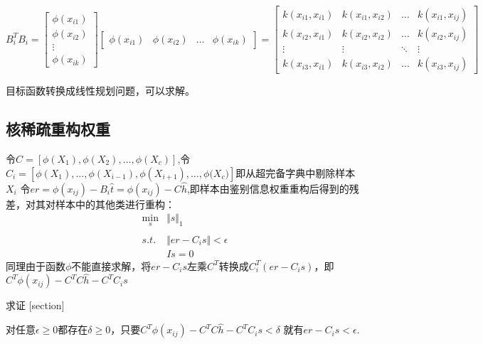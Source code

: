 \documentclass[bachelor,zhspacing]{cqu}  %
\begin{document}
\[B_{i}^{T}B_{i}=
    \left[
        \begin{array}{ccc}
            \phi{(x_{i1})}\\
            \phi{(x_{i2})}\\
            \vdots\\
            \phi{(x_{ik})}
        \end{array}
    \right]
    \left[
        \begin{array}{cccc}
            \phi{(x_{i1})} & \phi{(x_{i2})} & \ldots & \phi{(x_{ik})}
        \end{array}
    \right]=
    \left[
        \begin{array}{cccc}
            k(x_{i1},x_{i1}) & k(x_{i1},x_{i2}) & \ldots & k(x_{i1},x_{ij})\\
            k(x_{i2},x_{i1}) & k(x_{i2},x_{i2}) & \ldots & k(x_{i2},x_{ij})\\
            \vdots & \vdots & \ddots & \vdots \\
            k(x_{i3},x_{i1}) & k(x_{i3},x_{i2}) & \ldots & k(x_{i3},x_{ij})
        \end{array}
    \right]\]

目标函数转换成线性规划问题，可以求解。

\subsection{核稀疏重构权重}\label{ux6838ux7a00ux758fux91cdux6784ux6743ux91cd}

令\(C=[\phi{(X_{1})},\phi{(X_{2})},\ldots,\phi{(X_{c})}]\),令\(C_{i}=[\phi{(X_{1})},\ldots,\phi{(X_{i-1})},\phi{(X_{i+1})},\ldots,\phi{(X_{c}})]\)即从超完备字典中剔除样本\(X_{i}\)
令\(er=\phi{(x_{ij})}-B_{i}\hat{t}=\phi{(x_{ij})}-C\hat{h}\),即样本由鉴别信息权重重构后得到的残差，对其对样本中的其他类进行重构：
\[\begin{array}{ll}
        \min_{s} & \Vert{s}\Vert_{1}\\
        \\
        s.t.  & \Vert{er-C_{i}s}\Vert < \epsilon \\
        & Is = 0
    \end{array}\]
同理由于函数\(\phi\)不能直接求解，将\({er-C_{i}s}\)左乘\(C^{T}\)转换成\({C_{i}^{T}(er-C_{i}s)}\)，即\(C^{T}\phi{(x_{ij})}-C^{T}C\hat{h}-C^{T}C_{i}s\)

求证 {[}section{]}

对任意\(\epsilon\ge 0\)都存在\(\delta\ge 0\)，只要\(C^{T}\phi{(x_{ij})}-C^{T}C\hat{h}-C^{T}C_{i}s<\delta\)
就有\(er-C_{i}s < \epsilon\).
\end{document}
